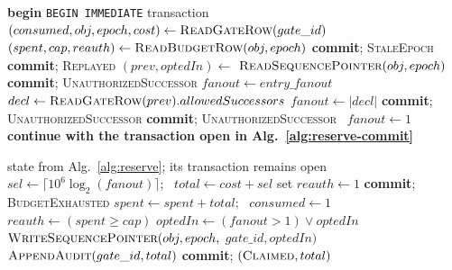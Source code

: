 \documentclass[conference,compsoc]{IEEEtran}
\begin{document}
{\begin{algorithm}[h]
\scriptsize
\caption{\texttt{Store.ClaimAndReserve} (part 1): checks and successor
authorization inside one transaction.}
\label{alg:reserve}
\begin{algorithmic}[1]
\State \textbf{begin} \texttt{BEGIN IMMEDIATE} transaction
\State $(consumed, obj, epoch, cost) \gets \Call{ReadGateRow}{gate\_id}$
\State $(spent, cap, reauth) \gets \Call{ReadBudgetRow}{obj, epoch}$
 \State \textbf{commit}; \Return \textsc{StaleEpoch}
\EndIf
{} \State \textbf{commit}; \Return \textsc{Replayed}
\EndIf
\State $(prev, optedIn) \gets{}$
\Statex \hspace{2em}$\textsc{ReadSequencePointer}(obj, epoch)$
   \State \textbf{commit}; \Return \textsc{UnauthorizedSuccessor}
  \EndIf
  \State $fanout \gets entry\_fanout$
\Else
  \State $decl \gets \Call{ReadGateRow}{prev}.allowedSuccessors$
    \State $fanout \gets |decl|$
     \State \textbf{commit}; \Return \textsc{UnauthorizedSuccessor}
    \EndIf
   \State \textbf{commit}; \Return \textsc{UnauthorizedSuccessor}
  \Else\ $fanout \gets 1$
  \EndIf
\EndIf
\State \textbf{continue with the transaction open in Alg.~\ref{alg:reserve-commit}}
\end{algorithmic}
\end{algorithm}

\begin{algorithm}[h]
\scriptsize
\caption{\texttt{Store.ClaimAndReserve} (part 2): reserve, state update,
and commit in the transaction opened by Alg.~\ref{alg:reserve}.}
\label{alg:reserve-commit}
\begin{algorithmic}[1]
\Require state from Alg.~\ref{alg:reserve}; its transaction remains open
\State $sel \gets \lceil 10^6 \log_2(fanout) \rceil$; \ $total \gets cost + sel$
  \State set $reauth \gets 1$
  \State \textbf{commit}; \Return \textsc{BudgetExhausted}
\Else
  \State $spent \gets spent + total$; \ $consumed \gets 1$
  \State $reauth \gets (spent \ge cap)$
  \State $optedIn \gets (fanout > 1) \vee optedIn$
  \State $\textsc{WriteSequencePointer}(obj, epoch,$
  \Statex \hspace{2.5em}$gate\_id, optedIn)$
  \State $\Call{AppendAudit}{gate\_id,total}$
  \State \textbf{commit}; \Return $(\textsc{Claimed}, total)$
\EndIf
\end{algorithmic}
\end{algorithm}

}
\end{document}
